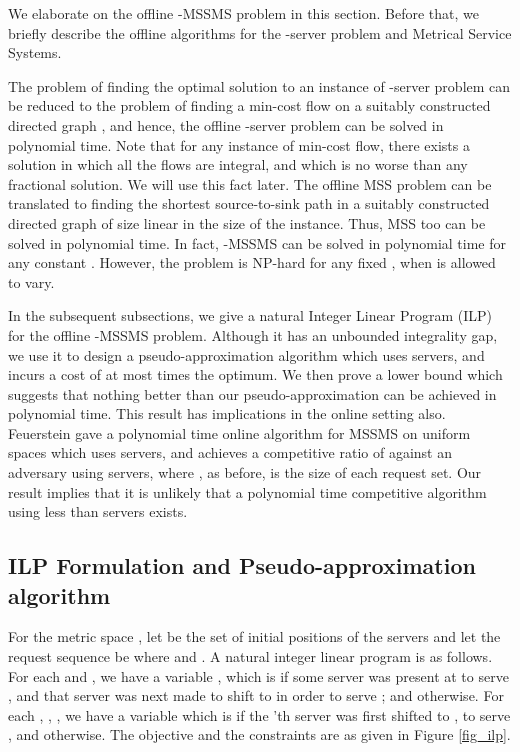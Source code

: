 \documentclass[11pt]{article}
\theoremstyle{plain}\newtheorem{theorem}{Theorem}
\theoremstyle{definition}
\theoremstyle{remark}
\begin{document}
We elaborate on the offline -MSSMS problem in this section. Before that, we briefly describe the offline algorithms for the -server problem and Metrical Service Systems.

The problem of finding the optimal solution to an instance of -server problem can be reduced to the problem of finding a min-cost flow on a suitably constructed directed graph \cite{ChrobakKPV91}, and hence, the offline -server problem can be solved in polynomial time. Note that for any instance of min-cost flow, there exists a solution in which all the flows are integral, and which is no worse than any fractional solution. We will use this fact later. The offline MSS problem can be translated to finding the shortest source-to-sink path in a suitably constructed directed graph of size linear in the size of the instance. Thus, MSS too can be solved in polynomial time. In fact, -MSSMS can be solved in polynomial time for any constant . However, the problem is NP-hard for any fixed , when  is allowed to vary.

In the subsequent subsections, we give a natural Integer Linear Program (ILP) for the offline -MSSMS problem. Although it has an unbounded integrality gap, we use it to design a pseudo-approximation algorithm which uses  servers, and incurs a cost of at most  times the optimum. We then prove a lower bound which suggests that nothing better than our pseudo-approximation can be achieved in polynomial time. This result has implications in the online setting also. Feuerstein \cite{Feuerstein98} gave a polynomial time online algorithm for MSSMS on uniform spaces which uses  servers, and achieves a competitive ratio of  against an adversary using  servers, where , as before, is the size of each request set. Our result implies that it is unlikely that a polynomial time competitive algorithm using less than  servers exists. 

\subsection{ILP Formulation and Pseudo-approximation algorithm}

For the metric space , let  be the set of initial positions of the  servers and let the request sequence be  where  and . A natural integer linear program is as follows. For each  and , we have a variable , which is  if some server was present at  to serve , and that server was next made to shift to  in order to serve ; and  otherwise. For each , , , we have a variable  which is  if the 'th server was first shifted to , to serve , and  otherwise. The objective and the constraints are as given in Figure \ref{fig_ilp}.
\end{document}
